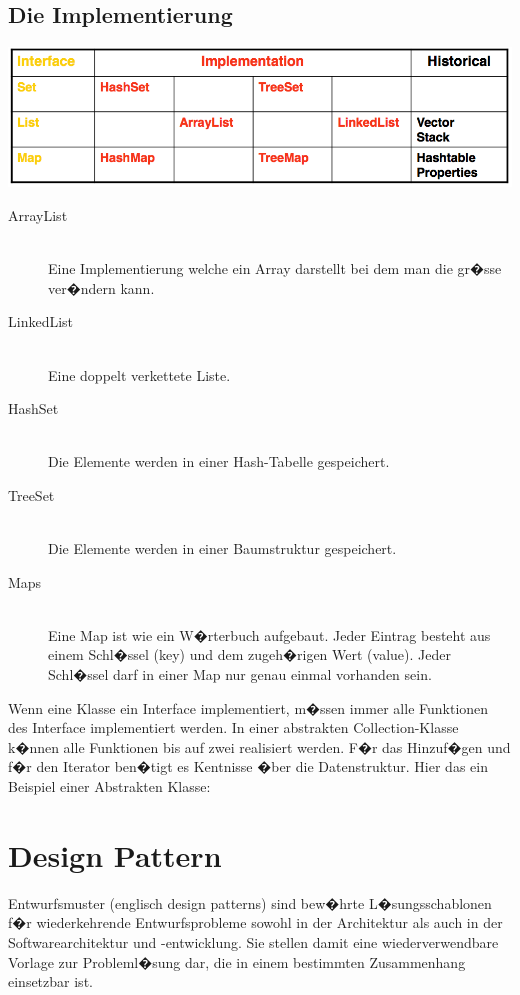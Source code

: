 \documentclass[a4paper, 11pt]{article}
\begin{document}
\subsection{Die Implementierung}
\includegraphics[scale=0.46]{jcf-implementations.png} 
\begin{description}
	\item[ArrayList] \hfill \\ Eine Implementierung welche ein Array darstellt bei dem man die gr�sse ver�ndern kann.
	\item[LinkedList] \hfill \\ Eine doppelt verkettete Liste.
	\item[HashSet] \hfill \\ Die Elemente werden in einer Hash-Tabelle gespeichert.
	\item[TreeSet] \hfill \\ Die Elemente werden in einer Baumstruktur gespeichert.
	\item[Maps] \hfill \\ Eine Map ist wie ein W�rterbuch aufgebaut. Jeder Eintrag besteht aus einem Schl�ssel (key) und dem zugeh�rigen Wert (value). Jeder Schl�ssel darf in einer Map nur genau einmal vorhanden sein.
\end{description}
Wenn eine Klasse ein Interface implementiert, m�ssen immer alle Funktionen des Interface implementiert werden. In einer abstrakten Collection-Klasse k�nnen alle Funktionen bis auf zwei realisiert werden. F�r das Hinzuf�gen und f�r den Iterator ben�tigt es Kentnisse �ber die Datenstruktur. Hier das ein Beispiel einer Abstrakten Klasse:


\section{Design Pattern}
Entwurfsmuster (englisch design patterns) sind bew�hrte L�sungsschablonen f�r wiederkehrende Entwurfsprobleme sowohl in der Architektur als auch in der Softwarearchitektur und -entwicklung. Sie stellen damit eine wiederverwendbare Vorlage zur Probleml�sung dar, die in einem bestimmten Zusammenhang einsetzbar ist.
\end{document}
